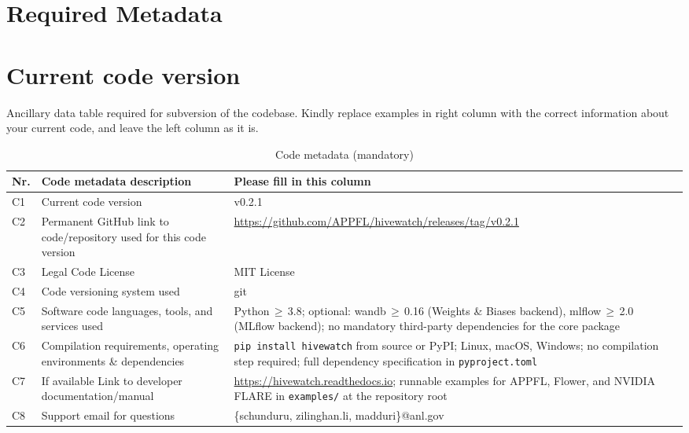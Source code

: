 \documentclass[preprint,12pt, a4paper]{elsarticle}
\begin{document}

\section*{Required Metadata}
\label{}

\section*{Current code version}
\label{}

Ancillary data table required for subversion of the codebase. Kindly replace examples in right column with the correct information about your current code, and leave the left column as it is.

\begin{table}[!h]
\begin{tabular}{|l|p{4.5cm}|p{7.5cm}|}
\hline
\textbf{Nr.} & \textbf{Code metadata description} & \textbf{Please fill in this column} \\
\hline
C1 & Current code version & v0.2.1 \\
\hline
C2 & Permanent GitHub link to code/repository used for this code version & \url{https://github.com/APPFL/hivewatch/releases/tag/v0.2.1} \\
\hline
C3 & Legal Code License   & MIT License \\
\hline
C4 & Code versioning system used & git \\
\hline
C5 & Software code languages, tools, and services used & Python\,$\geq$\,3.8; optional: wandb\,$\geq$\,0.16 (Weights \& Biases backend), mlflow\,$\geq$\,2.0 (MLflow backend); no mandatory third-party dependencies for the core package \\
\hline
C6 & Compilation requirements, operating environments \& dependencies & \texttt{pip install hivewatch} from source or PyPI; Linux, macOS, Windows; no compilation step required; full dependency specification in \texttt{pyproject.toml} \\
\hline
C7 & If available Link to developer documentation/manual & \url{https://hivewatch.readthedocs.io}; runnable examples for APPFL, Flower, and NVIDIA FLARE in \texttt{examples/} at the repository root \\
\hline
C8 & Support email for questions & \{schunduru, zilinghan.li, madduri\}@anl.gov \\
\hline
\end{tabular}
\caption{Code metadata (mandatory)}
\label{tab:codemeta}
\end{table}
\end{document}
